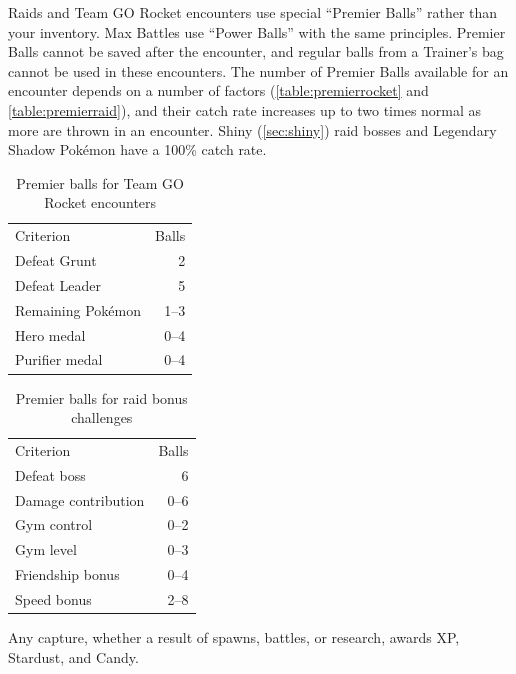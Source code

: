 Raids and Team GO Rocket encounters use special ``Premier Balls'' rather than your inventory.
Max Battles use ``Power Balls'' with the same principles.
Premier Balls cannot be saved after the encounter, and regular balls from
  a Trainer's bag cannot be used in these encounters.
The number of Premier Balls available for an encounter depends on a number of factors (\autoref{table:premierrocket}
  and \autoref{table:premierraid}), and their catch rate increases up to two times normal as more are thrown in an encounter.
Shiny (\autoref{sec:shiny}) raid bosses and Legendary Shadow Pokémon have a 100\% catch rate.
\begin{table}
\centering
\begin{tabular}{lr}
Criterion & Balls\\
\Midrule
Defeat Grunt & 2\\
Defeat Leader & 5\\
Remaining Pokémon & 1--3\\
Hero medal & 0--4\\
Purifier medal & 0--4\\
\end{tabular}
\caption{Premier balls for Team GO Rocket encounters}
\label{table:premierrocket}
\end{table}
\begin{table}
\centering
\begin{tabular}{lr}
Criterion & Balls\\
\Midrule
  Defeat boss & 6\\
  Damage contribution & 0--6\\
  Gym control & 0--2\\
  Gym level & 0--3\\
  Friendship bonus & 0--4\\
  Speed bonus & 2--8\\
\end{tabular}
\caption{Premier balls for raid bonus challenges}
\label{table:premierraid}
\end{table}
Any capture, whether a result of spawns, battles, or research, awards XP,
 Stardust, and Candy.

